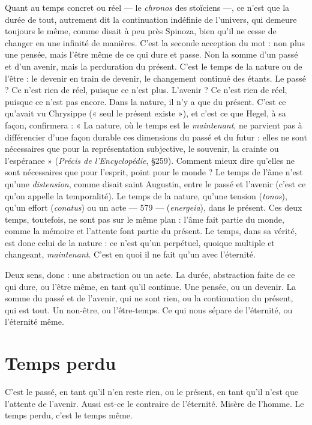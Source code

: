 Quant au temps concret ou réel — le {\it chronos} des stoïciens —, ce n’est que la
durée de tout, autrement dit la continuation indéfinie de l’univers, qui
demeure toujours le même, comme disait à peu près Spinoza, bien qu’il ne
cesse de changer en une infinité de manières. C’est la seconde acception du
mot : non plus une pensée, mais l'être même de ce qui dure et passe. Non la
somme d’un passé et d’un avenir, mais la perduration du présent. C’est le
temps de la nature ou de l’être : le devenir en train de devenir, le changement
continué des étants. Le passé ? Ce n’est rien de réel, puisque ce n’est plus.
L'avenir ? Ce n’est rien de réel, puisque ce n’est pas encore. Dans la nature, il
n’y a que du présent. C’est ce qu'avait vu Chrysippe (« seul le présent existe »),
et c’est ce que Hegel, à sa façon, confirmera : « La nature, où le temps est le
{\it maintenant}, ne parvient pas à différencier d’une façon durable ces dimensions
du passé et du futur : elles ne sont nécessaires que pour la représentation subjective,
le souvenir, la crainte ou l’espérance » ({\it Précis de l'Encyclopédie}, \S 259).
Comment mieux dire qu’elles ne sont nécessaires que pour l’esprit, point pour
le monde ? Le temps de l’âme n’est qu’une {\it distension}, comme disait saint
Augustin, entre le passé et l’avenir (c’est ce qu’on appelle la temporalité). Le
temps de la nature, qu’une tension ({\it tonos}), qu’un effort ({\it conatus}) ou un acte
— 579 —
({\it energeia}), dans le présent. Ces deux temps, toutefois, ne sont pas sur le même
plan : l’âme fait partie du monde, comme la mémoire et l'attente font partie du
présent. Le temps, dans sa vérité, est donc celui de la nature : ce n’est qu’un
perpétuel, quoique multiple et changeant, {\it maintenant}. C’est en quoi il ne fait
qu’un avec l'éternité.

Deux sens, donc : une abstraction ou un acte. La durée, abstraction faite de
ce qui dure, ou l’être même, en tant qu’il continue. Une pensée, ou un devenir.
La somme du passé et de l'avenir, qui ne sont rien, ou la continuation du présent,
qui est tout. Un non-être, ou l’être-temps. Ce qui nous sépare de l’éternité,
ou l'éternité même.

\section{Temps perdu}
C'est le passé, en tant qu’il n’en reste rien, ou le présent, en
tant qu’il n’est que l'attente de l’avenir. Aussi est-ce le
contraire de l'éternité. Misère de l’homme. Le temps perdu, c’est le temps
même.

